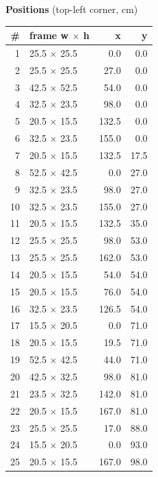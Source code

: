\documentclass[a4paper,landscape,10pt]{article}
\begin{document}
\begin{minipage}[t]{0.25\textwidth}
\vspace{8pt}
{\bfseries Positions} (top-left corner, cm)\\[2pt]
\tiny
\begin{tabular}{@{}r l r r@{}}
\toprule
\# & frame w $\times$ h & x & y \\
\midrule
1 & 25.5 $\times$ 25.5 & 0.0 & 0.0 \\
2 & 25.5 $\times$ 25.5 & 27.0 & 0.0 \\
3 & 42.5 $\times$ 52.5 & 54.0 & 0.0 \\
4 & 32.5 $\times$ 23.5 & 98.0 & 0.0 \\
5 & 20.5 $\times$ 15.5 & 132.5 & 0.0 \\
6 & 32.5 $\times$ 23.5 & 155.0 & 0.0 \\
7 & 20.5 $\times$ 15.5 & 132.5 & 17.5 \\
8 & 52.5 $\times$ 42.5 & 0.0 & 27.0 \\
9 & 32.5 $\times$ 23.5 & 98.0 & 27.0 \\
10 & 32.5 $\times$ 23.5 & 155.0 & 27.0 \\
11 & 20.5 $\times$ 15.5 & 132.5 & 35.0 \\
12 & 25.5 $\times$ 25.5 & 98.0 & 53.0 \\
13 & 25.5 $\times$ 25.5 & 162.0 & 53.0 \\
14 & 20.5 $\times$ 15.5 & 54.0 & 54.0 \\
15 & 20.5 $\times$ 15.5 & 76.0 & 54.0 \\
16 & 32.5 $\times$ 23.5 & 126.5 & 54.0 \\
17 & 15.5 $\times$ 20.5 & 0.0 & 71.0 \\
18 & 20.5 $\times$ 15.5 & 19.5 & 71.0 \\
19 & 52.5 $\times$ 42.5 & 44.0 & 71.0 \\
20 & 42.5 $\times$ 32.5 & 98.0 & 81.0 \\
21 & 23.5 $\times$ 32.5 & 142.0 & 81.0 \\
22 & 20.5 $\times$ 15.5 & 167.0 & 81.0 \\
23 & 25.5 $\times$ 25.5 & 17.0 & 88.0 \\
24 & 15.5 $\times$ 20.5 & 0.0 & 93.0 \\
25 & 20.5 $\times$ 15.5 & 167.0 & 98.0 \\
\bottomrule
\end{tabular}
\end{minipage}
\clearpage
\end{document}
